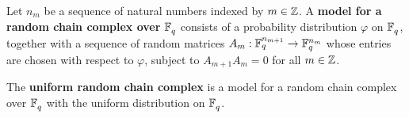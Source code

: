 



\begin{definition}
  Let $n_m$ be a sequence of natural numbers indexed by $m \in \mathbb{Z}$.  A {\bf
  model for a random chain complex over} $\mathbb{F}_q^{}$ consists of a probability
  distribution $\varphi$ on $\mathbb{F}_q^{}$, together with a sequence of random matrices
  $A_m: \mathbb{F}_q^{n_{m+1}} \rightarrow \mathbb{F}_q^{n_m}$ whose entries are chosen with respect to
  $\varphi$, subject to $A_{m+1}A_m = 0$ for all $m \in \mathbb{Z}$.
\end{definition}


\begin{definition}
  The {\bf uniform random chain complex} is a model for a random chain complex
  over $\mathbb{F}_q^{}$ with the uniform distribution on $\mathbb{F}_q^{}$. 
  \label{defn:random_chain_cx}
\end{definition}




